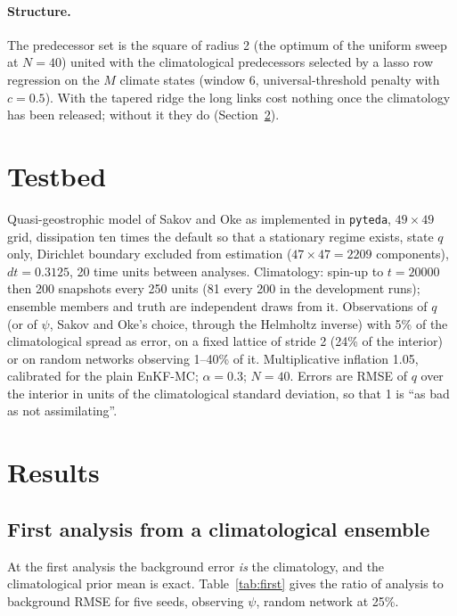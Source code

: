\documentclass[11pt]{article}
\begin{document}
\paragraph{Structure.} The predecessor set is the square of radius 2 (the optimum of
the uniform sweep at $N=40$) united with the climatological predecessors selected by a
lasso row regression on the $M$ climate states (window 6, universal-threshold penalty
with $c=0.5$). With the tapered ridge the long links cost nothing once the climatology
has been released; without it they do (Section~\ref{sec:results}).

\section{Testbed}\label{sec:setup}
Quasi-geostrophic model of Sakov and Oke as implemented in \texttt{pyteda}, $49\times49$
grid, dissipation ten times the default so that a stationary regime exists, state
$q$ only, Dirichlet boundary excluded from estimation ($47\times47=2209$ components),
$dt=0.3125$, 20 time units between analyses. Climatology: spin-up to $t=20000$ then
200 snapshots every 250 units (81 every 200 in the development runs); ensemble members
and truth are independent draws from it. Observations of $q$ (or of $\psi$, Sakov and
Oke's choice, through the Helmholtz inverse) with 5\% of the climatological spread as
error, on a fixed lattice of stride 2 (24\% of the interior) or on random networks
observing 1--40\% of it. Multiplicative inflation 1.05, calibrated for the plain
EnKF-MC; $\alpha=0.3$; $N=40$. Errors are RMSE of $q$ over the interior in units of
the climatological standard deviation, so that 1 is ``as bad as not assimilating''.

\section{Results}\label{sec:results}

\subsection{First analysis from a climatological ensemble}
At the first analysis the background error \emph{is} the climatology, and the
climatological prior mean is exact. Table~\ref{tab:first} gives the ratio of analysis to
background RMSE for five seeds, observing $\psi$, random network at 25\%.
\end{document}
